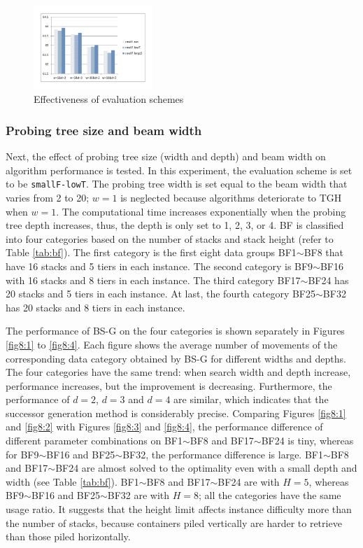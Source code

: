 \documentclass[review,3p,times,authoryear,12pt]{elsarticle}
\begin{document}
\begin{figure}[!htb]
\centering
\includegraphics[width=0.4\textwidth]{fig7.pdf}
\caption{Effectiveness of evaluation schemes}
\label{fig7}
\end{figure}

\subsubsection{Probing tree size and beam width}

Next, the effect of probing tree size (width and depth) and beam width on algorithm performance is tested.
In this experiment, the evaluation scheme is set to be \texttt{smallF-lowT}.
The probing tree width is set equal to the beam width that varies from 2 to 20; $w=1$ is neglected because algorithms deteriorate to TGH when $w=1$.
The computational time increases exponentially when the probing tree depth increases, thus, the depth is only set to 1, 2, 3, or 4.
BF is classified into four categories based on the number of stacks and stack height (refer to Table \ref{tab:bf}).
The first category is the first eight data groups BF1$\sim$BF8 that have 16 stacks and 5 tiers in each instance.
The second category is BF9$\sim$BF16 with 16 stacks and 8 tiers in each instance.
The third category BF17$\sim$BF24 has 20 stacks and 5 tiers in each instance.
At last, the fourth category BF25$\sim$BF32 has 20 stacks and 8 tiers in each instance.

The performance of BS-G on the four categories is shown separately in Figures \ref{fig8:1} to \ref{fig8:4}.
Each figure shows the average number of movements of the corresponding data category obtained by BS-G for different widths and depths.
The four categories have the same trend: when search width and depth increase, performance increases, but the improvement is decreasing. Furthermore, the performance of $d=2$, $d=3$ and $d=4$ are similar, which indicates that the successor generation method is considerably precise.
Comparing Figures \ref{fig8:1} and \ref{fig8:2} with Figures \ref{fig8:3} and \ref{fig8:4}, the performance difference of different parameter combinations on BF1$\sim$BF8 and BF17$\sim$BF24 is tiny, whereas for BF9$\sim$BF16 and BF25$\sim$BF32, the performance difference is large.
BF1$\sim$BF8 and BF17$\sim$BF24 are almost solved to the optimality even with a small depth and width (see Table \ref{tab:bf}).
BF1$\sim$BF8 and BF17$\sim$BF24 are with $H=5$, whereas BF9$\sim$BF16 and BF25$\sim$BF32 are with $H=8$; all the categories have the same usage ratio.
It suggests that the height limit affects instance difficulty more than the number of stacks, because containers piled vertically are harder to retrieve than those piled horizontally.
\end{document}
